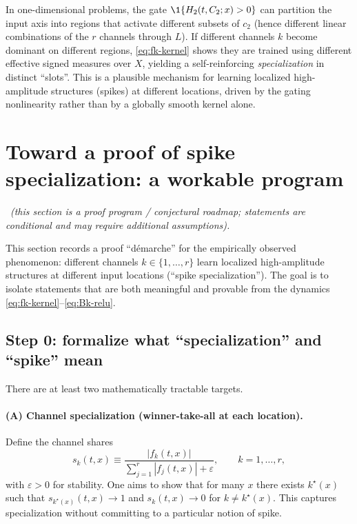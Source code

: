 \begin{remark}
In one-dimensional problems, the gate $\1\{H_2(t,C_2;x)>0\}$ can partition the input axis into regions that activate different subsets of $c_2$ (hence different linear combinations of the $r$ channels through $L$).
If different channels $k$ become dominant on different regions, \eqref{eq:fk-kernel} shows they are trained using different effective signed measures over $X$, yielding a self-reinforcing \emph{specialization} in distinct ``slots''.
This is a plausible mechanism for learning localized high-amplitude structures (spikes) at different locations, driven by the gating nonlinearity rather than by a globally smooth kernel alone.
\end{remark}

\section{Toward a proof of spike specialization: a workable program}\label{sec:proof-program}
\openflag\ \textit{(this section is a proof program / conjectural roadmap; statements are conditional and may require additional assumptions).}

This section records a proof ``d\'emarche'' for the empirically observed phenomenon:
different channels $k\in\{1,\dots,r\}$ learn localized high-amplitude structures at different input locations (``spike specialization'').
The goal is to isolate statements that are both meaningful and provable from the dynamics \eqref{eq:fk-kernel}--\eqref{eq:Bk-relu}.

\subsection{Step 0: formalize what ``specialization'' and ``spike'' mean}

There are at least two mathematically tractable targets.

\paragraph{(A) Channel specialization (winner-take-all at each location).}
Define the channel shares
\[
s_k(t,x)\equiv \frac{|f_k(t,x)|}{\sum_{j=1}^r |f_j(t,x)|+\varepsilon},\qquad k=1,\dots,r,
\]
with $\varepsilon>0$ for stability.
One aims to show that for many $x$ there exists $k^\star(x)$ such that $s_{k^\star(x)}(t,x)\to 1$ and $s_{k}(t,x)\to 0$ for $k\neq k^\star(x)$.
This captures specialization without committing to a particular notion of spike.

